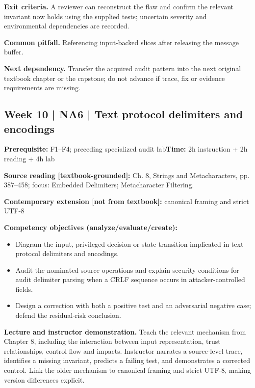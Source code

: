 \documentclass[10pt,letterpaper]{article}
\begin{document}
\textbf{Exit criteria.} A reviewer can reconstruct the flaw and confirm the relevant invariant now holds using the supplied tests; uncertain severity and environmental dependencies are recorded.

\textbf{Common pitfall.} Referencing input-backed slices after releasing the message buffer.

\textbf{Next dependency.} Transfer the acquired audit pattern into the next original textbook chapter or the capstone; do not advance if trace, fix or evidence requirements are missing.

\subsection{Week 10 | NA6 | Text protocol delimiters and encodings}
\textbf{Prerequisite:} F1--F4; preceding specialized audit lab\hfill\textbf{Time:} 2h instruction + 2h reading + 4h lab

\textbf{Source reading [textbook-grounded]:} Ch. 8, Strings and Metacharacters, pp. 387--458; focus: Embedded Delimiters; Metacharacter Filtering.

\textbf{Contemporary extension [not from textbook]:} canonical framing and strict UTF-8

\textbf{Competency objectives (analyze/evaluate/create):}
\begin{itemize}[leftmargin=*,itemsep=2pt]
\item Diagram the input, privileged decision or state transition implicated in text protocol delimiters and encodings.
\item Audit the nominated source operations and explain security conditions for audit delimiter parsing when a CRLF sequence occurs in attacker-controlled fields.
\item Design a correction with both a positive test and an adversarial negative case; defend the residual-risk conclusion.
\end{itemize}
\textbf{Lecture and instructor demonstration.} Teach the relevant mechanism from Chapter 8, including the interaction between input representation, trust relationships, control flow and impacts. Instructor narrates a source-level trace, identifies a missing invariant, predicts a failing test, and demonstrates a corrected control. Link the older mechanism to canonical framing and strict UTF-8, making version differences explicit.
\end{document}
